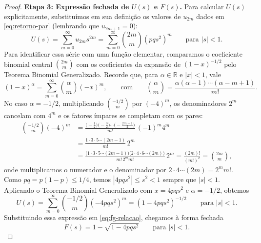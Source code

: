 \documentclass[12pt,portuguese]{article}
\theoremstyle{definition}
\theoremstyle{plainexercise}
\theoremstyle{starredexercise}
\theoremstyle{definition}
\begin{document}
\begin{proof}
\smallskip
\noindent\textbf{Etapa 3: Expressão fechada de $U(s)$ e $F(s)$.}
Para calcular $U(s)$ explicitamente, substituímos em sua definição os valores de
$u_{2m}$ dados em \eqref{eq:retorno-par} (lembrando que $u_{2m+1} = 0$):
\[
U(s) = \sum_{m=0}^{\infty} u_{2m} s^{2m}
= \sum_{m=0}^{\infty} \binom{2m}{m} (pqs^2)^m
\qquad\text{para } |s| < 1.
\]
Para identificar essa série com uma função elementar, comparamos o coeficiente
binomial central $\binom{2m}{m}$ com os coeficientes da expansão de
$(1 - x)^{-1/2}$ pelo Teorema Binomial Generalizado. Recorde que, para
$\alpha \in \mathbb{R}$ e $|x| < 1$, vale
\[
(1 - x)^{\alpha} = \sum_{m=0}^{\infty} \binom{\alpha}{m}(-x)^m,
\qquad\text{com}\qquad
\binom{\alpha}{m} = \frac{\alpha(\alpha - 1)\cdots(\alpha - m + 1)}{m!}.
\]
No caso $\alpha = -1/2$, multiplicando $\binom{-1/2}{m}$ por $(-4)^m$, os
denominadores $2^m$ cancelam com $4^m$ e os fatores ímpares se completam com os
pares:
\begin{align*}
\binom{-1/2}{m}(-4)^m
&= \frac{\bigl(-\tfrac{1}{2}\bigr)\bigl(-\tfrac{3}{2}\bigr)\cdots\bigl(-\tfrac{2m-1}{2}\bigr)}{m!}\,(-1)^m 4^m \\[0.3cm]
&= \frac{1 \cdot 3 \cdot 5 \cdots (2m - 1)}{m!}\,2^m \\[0.3cm]
&= \frac{\bigl(1 \cdot 3 \cdot 5 \cdots (2m - 1)\bigr)\bigl(2 \cdot 4 \cdot 6 \cdots (2m)\bigr)}{m!\,2^m m!}\,2^m
= \frac{(2m)!}{(m!)^2} = \binom{2m}{m},
\end{align*}
onde multiplicamos o numerador e o denominador por
$2 \cdot 4 \cdots (2m) = 2^m m!$. Como $pq = p(1 - p) \leqslant 1/4$, temos
$|4pqs^2| \leqslant s^2 < 1$ sempre que $|s| < 1$. Aplicando o Teorema Binomial
Generalizado com $x = 4pqs^2$ e $\alpha = -1/2$, obtemos
\[
U(s) = \sum_{m=0}^{\infty} \binom{-1/2}{m}(-4pqs^2)^m
= (1 - 4pqs^2)^{-1/2}
\qquad\text{para } |s| < 1.
\]
Substituindo essa expressão em \eqref{eq:fg-relacao}, chegamos à forma fechada
\begin{equation}\label{eq:fg-primeiro-retorno}
F(s) = 1 - \sqrt{1 - 4pqs^2}
\qquad\text{para } |s| < 1.
\end{equation}


\end{proof}
\end{document}
